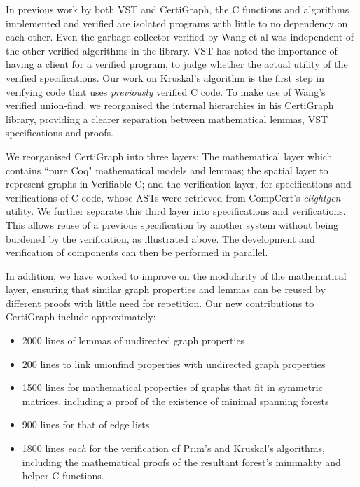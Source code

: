 In previous work by both VST and CertiGraph, the C functions and algorithms implemented and verified are isolated programs with little to no dependency on each other. Even the garbage collector verified by Wang et al\cite{DBLP:journals/pacmpl/WangCMH19} was independent of the other verified algorithms in the library. VST has noted the importance of having a client for a verified program, to judge whether the actual utility of the verified specifications\cite{DBLP:conf/iwmm/AppelN20}. Our work on Kruskal's algorithm is the first step in verifying code that uses \textit{previously} verified C code. To make use of Wang's verified union-find, we reorganised the internal hierarchies in his CertiGraph library, providing a clearer separation between mathematical lemmas, VST specifications and proofs.


We reorganised CertiGraph into three layers: The mathematical layer which contains ``pure Coq" mathematical models and lemmas; the spatial layer to represent graphs in Verifiable C; and the verification layer, for specifications and verifications of C code, whose ASTs were retrieved from CompCert's \textit{clightgen} utility. We further separate this third layer into specifications and verifications. This allows reuse of a previous specification by another system without being burdened by the verification, as illustrated above. The development and verification of components can then be performed in parallel.

In addition, we have worked to improve on the modularity of the mathematical layer, ensuring that similar graph properties and lemmas can be reused by different proofs with little need for repetition. Our new contributions to CertiGraph include approximately:
\begin{itemize}
\item2000 lines of lemmas of undirected graph properties
\item200 lines to link unionfind properties with undirected graph properties
\item1500 lines for mathematical properties of graphs that fit in symmetric matrices, including a proof of the existence of minimal spanning forests
\item900 lines for that of edge lists
\item1800 lines \textit{each} for the verification of Prim's and Kruskal's algorithms, including the mathematical proofs of the resultant forest's minimality and helper C functions.
\end{itemize}